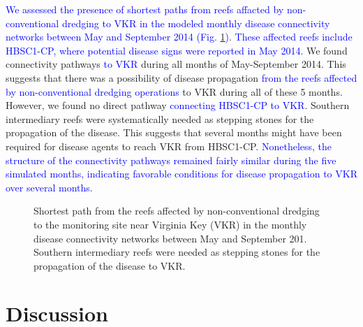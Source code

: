\documentclass[preprint,12pt,authoryear]{elsarticle}
\newcommand{\modif}[1]{\textcolor{blue}{#1}}
\begin{document}
\modif{We assessed the presence of shortest paths from reefs affacted by non-conventional dredging to VKR in the modeled monthly disease connectivity networks between May and September 2014 (Fig. \ref{fig:onset_path})}. \modif{These affected reefs include HBSC1-CP, where potential disease signs were reported in May 2014}. We found connectivity pathways \modif{to VKR} during all months of May-September 2014. This suggests that there was a possibility of disease propagation \modif{from the reefs affected by non-conventional dredging operations} to VKR during all of these 5 months. However, we found no direct pathway \modif{connecting HBSC1-CP to VKR}. Southern intermediary reefs were systematically needed as stepping stones for the propagation of the disease. This suggests that several months might have been required for disease agents to reach VKR from HBSC1-CP. \modif{Nonetheless, the structure of the connectivity pathways remained fairly similar during the five simulated months, indicating favorable conditions for disease propagation to VKR over several months.}

\begin{figure}
	\centering
    \caption{Shortest path from the reefs affected by non-conventional dredging to the monitoring site near Virginia Key (VKR) in the monthly disease connectivity networks between May and September 201. Southern intermediary reefs were needed as stepping stones for the propagation of the disease to VKR.}
	\label{fig:onset_path}
\end{figure}

\section{Discussion}

\end{document}
